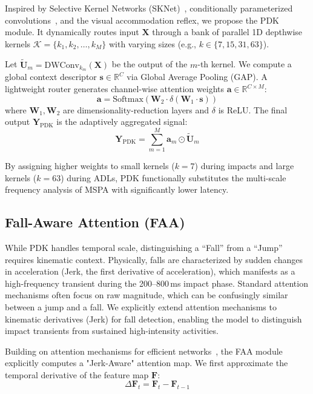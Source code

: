\documentclass{article}
\begin{document}
Inspired by Selective Kernel Networks (SKNet)~\cite{li2019sknet}, conditionally parameterized convolutions~\cite{Yang2019CondConv}, and the visual accommodation reflex, we propose the PDK module. It dynamically routes input $\mathbf{X}$ through a bank of parallel 1D depthwise kernels $\mathcal{K} = \{k_1, k_2, \dots, k_M\}$ with varying sizes (e.g., $k \in \{7, 15, 31, 63\}$).

Let $\tilde{\mathbf{U}}_m = \text{DWConv}_{k_m}(\mathbf{X})$ be the output of the $m$-th kernel. We compute a global context descriptor $\mathbf{s} \in \mathbb{R}^C$ via Global Average Pooling (GAP). A lightweight router generates channel-wise attention weights $\mathbf{a} \in \mathbb{R}^{C \times M}$:
\begin{equation}
\mathbf{a} = \text{Softmax}(\mathbf{W}_2 \cdot \delta(\mathbf{W}_1 \cdot \mathbf{s}))
\end{equation}
where $\mathbf{W}_1, \mathbf{W}_2$ are dimensionality-reduction layers and $\delta$ is ReLU. The final output $\mathbf{Y}_{\text{PDK}}$ is the adaptively aggregated signal:
\begin{equation}
\mathbf{Y}_{\text{PDK}} = \sum_{m=1}^M \mathbf{a}_m \odot \tilde{\mathbf{U}}_m
\end{equation}

By assigning higher weights to small kernels ($k=7$) during impacts and large kernels ($k=63$) during ADLs, PDK functionally substitutes the multi-scale frequency analysis of MSPA with significantly lower latency.

\subsection{Fall-Aware Attention (FAA)}

While PDK handles temporal scale, distinguishing a ``Fall'' from a ``Jump'' requires kinematic context. Physically, falls are characterized by sudden changes in acceleration (Jerk, the first derivative of acceleration), which manifests as a high-frequency transient during the 200--800\,ms impact phase. Standard attention mechanisms often focus on raw magnitude, which can be confusingly similar between a jump and a fall. We explicitly extend attention mechanisms to kinematic derivatives (Jerk) for fall detection, enabling the model to distinguish impact transients from sustained high-intensity activities.

Building on attention mechanisms for efficient networks~\cite{woo2018cbam,hou2021coordinate}, the FAA module explicitly computes a "Jerk-Aware" attention map. We first approximate the temporal derivative of the feature map $\mathbf{F}$:
\begin{equation}
\Delta \mathbf{F}_t = \mathbf{F}_t - \mathbf{F}_{t-1}
\end{equation}
\end{document}
